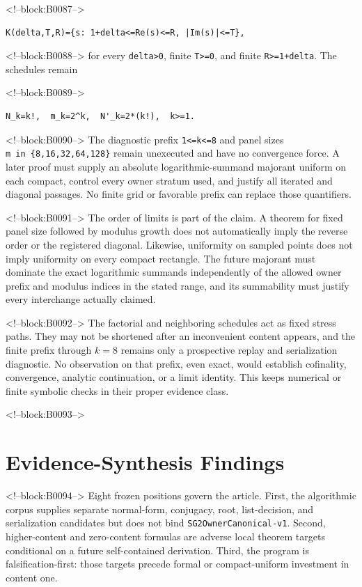 \documentclass[11pt]{article}
\begin{document}
<!--block:B0087-->
\begin{verbatim}
K(delta,T,R)={s: 1+delta<=Re(s)<=R, |Im(s)|<=T},
\end{verbatim}

<!--block:B0088-->
for every \texttt{delta\textgreater{}0}, finite
\texttt{T\textgreater{}=0}, and finite \texttt{R\textgreater{}=1+delta}.
The schedules remain

<!--block:B0089-->
\begin{verbatim}
N_k=k!,  m_k=2^k,  N'_k=2*(k!),  k>=1.
\end{verbatim}

<!--block:B0090-->
The diagnostic prefix \texttt{1\textless{}=k\textless{}=8} and panel
sizes \texttt{m\ in\ \{8,16,32,64,128\}} remain unexecuted and have no
convergence force. A later proof must supply an absolute
logarithmic-summand majorant uniform on each compact, control every
owner stratum used, and justify all iterated and diagonal passages. No
finite grid or favorable prefix can replace those quantifiers.

<!--block:B0091-->
The order of limits is part of the claim. A theorem for fixed panel size
followed by modulus growth does not automatically imply the reverse
order or the registered diagonal. Likewise, uniformity on sampled
points does not imply uniformity on every compact rectangle. The future
majorant must dominate the exact logarithmic summands independently of
the allowed owner prefix and modulus indices in the stated range, and
its summability must justify every interchange actually claimed.

<!--block:B0092-->
The factorial and neighboring schedules act as fixed stress paths. They
may not be shortened after an inconvenient content appears, and the
finite prefix through $k=8$ remains only a prospective replay and
serialization diagnostic. No observation on that prefix, even exact,
would establish cofinality, convergence, analytic continuation, or a
limit identity. This keeps numerical or finite symbolic checks in their
proper evidence class.

<!--block:B0093-->
\hypertarget{5-evidence-synthesis-findings}{%
\section{Evidence-Synthesis
Findings}\label{5-evidence-synthesis-findings}}

<!--block:B0094-->
Eight frozen positions govern the article. First, the algorithmic corpus
supplies separate normal-form, conjugacy, root, list-decision, and
serialization candidates but does not bind
\texttt{SG2OwnerCanonical-v1}. Second, higher-content and zero-content
formulas are adverse local theorem targets conditional on a future
self-contained derivation. Third, the program is falsification-first:
those targets precede formal or compact-uniform investment in content
one.
\end{document}
